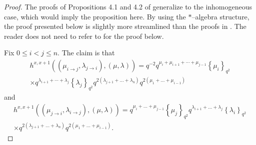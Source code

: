\documentclass{ximera}
\begin{document}
\begin{proof}
The proofs of Propositions 4.1 and 4.2 of \cite{Kuan-IMRN} generalize to the inhomogeneous case, which would imply the proposition here. By using the $*$--algebra structure, the proof presented below is slightly more streamlined than the proofs in \cite{Kuan-IMRN}. The reader does not need to refer to \cite{Kuan-IMRN} for the proof below.

Fix $0 \leq i < j \leq n$. The claim is that
\begin{multline}
h^{x, x+1}\left(\left(\mu_{i \rightarrow j}, \lambda_{j \rightarrow i}\right),(\mu, \lambda)\right)  
=q^{-2} q^{\mu_{i}+\mu_{i+1}+\cdots+\mu_{j-1}}\left\{\mu_{i}\right\}_{q^{2}}\\ \times q^{\lambda_{i+1}+\cdots+\lambda_{j}}\left\{\lambda_{j}\right\}_{q^{2}} q^{2\left(\lambda_{j+1}+\ldots+\lambda_{n}\right)} q^{2\left(\mu_{1}+\ldots+\mu_{i-1}\right)} \label{LeftJumps}
\end{multline}
and
\begin{multline}
    h^{x, x+1}\left(\left(\mu_{j \rightarrow i}, \lambda_{i \rightarrow j}\right),(\mu, \lambda)\right)=q^{\mu_{i}+\ldots+\mu_{j-1}}\left\{\mu_{j}\right\}_{q^{2}} q^{\lambda_{i+1}+\ldots+\lambda_{j}}\left\{\lambda_{i}\right\}_{q^{2}}\\ \times q^{2\left(\lambda_{j+1}+\ldots+\lambda_{n}\right)} q^{2\left(\mu_{1}+\ldots+\mu_{i-1}\right)}. \label{RightJumps}
\end{multline}


\end{proof}
\end{document}
